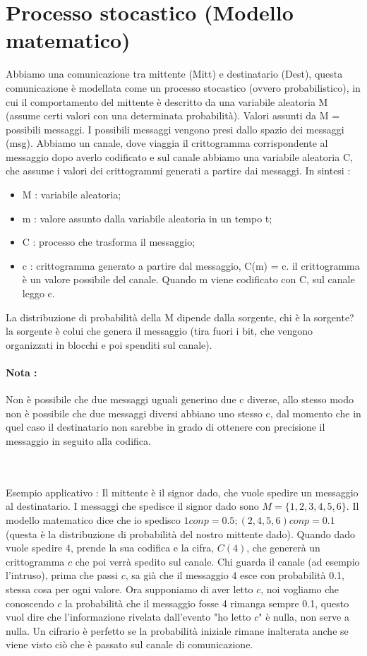 \section{Processo stocastico (Modello matematico)}
Abbiamo una comunicazione tra mittente (Mitt) e destinatario (Dest), questa comunicazione è modellata come un processo stocastico (ovvero probabilistico), in cui il comportamento del mittente è descritto da una variabile aleatoria M (assume certi valori con una determinata probabilità). Valori assunti da M = possibili messaggi. I possibili messaggi vengono presi dallo spazio dei messaggi (msg). Abbiamo un canale, dove viaggia il crittogramma corrispondente al messaggio dopo averlo codificato e sul canale abbiamo una variabile aleatoria C, che assume i valori dei crittogrammi generati a partire dai messaggi. 
In sintesi : 
\begin{itemize}
	\item M : variabile aleatoria;
	\item m : valore assunto dalla variabile aleatoria in un tempo t;
	\item C : processo che trasforma il messaggio; 
	\item c : crittogramma generato a partire dal messaggio, C(m) = c. il crittogramma è un valore possibile del canale. Quando m viene codificato con C, sul canale leggo c.
\end{itemize}
La distribuzione di probabilità della M dipende dalla sorgente, chi è la sorgente? la sorgente è colui che genera il messaggio (tira fuori i bit, che vengono organizzati in blocchi e poi spenditi sul canale).

\paragraph{Nota :} Non è possibile che due messaggi uguali generino due c diverse, allo stesso modo non è possibile che due messaggi diversi abbiano uno stesso c, dal momento che in quel caso il destinatario non sarebbe in grado di ottenere con precisione il messaggio in seguito alla codifica.

\\\\
Esempio applicativo : 
Il mittente è il signor dado, che vuole spedire un messaggio al destinatario. I messaggi che spedisce il signor dado sono $M = \{1, 2, 3, 4, 5, 6\}$. Il modello matematico dice che io spedisco $1 con p = 0.5; (2, 4, 5, 6) con p = 0.1$ (questa è la distribuzione di probabilità del nostro mittente dado). Quando dado vuole spedire $4$, prende la sua codifica e la cifra, $C(4)$, che genererà un crittogramma $c$ che poi verrà spedito sul canale. Chi guarda il canale (ad esempio l'intruso), prima che passi $c$, sa già che il messaggio 4 esce con probabilità 0.1, stessa cosa per ogni valore. Ora supponiamo di aver letto $c$, noi vogliamo che conoscendo $c$ la probabilità che il messaggio fosse 4 rimanga sempre 0.1, questo vuol dire che l'informazione rivelata dall'evento "ho letto $c$" è nulla, non serve a nulla. Un cifrario è perfetto se la probabilità iniziale rimane inalterata anche se viene visto ciò che è passato sul canale di comunicazione.

